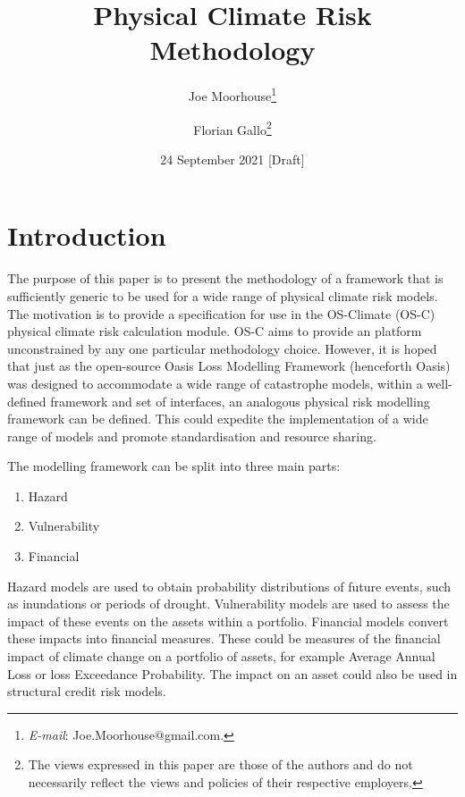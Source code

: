 \documentclass[a4paper,11pt]{extarticle} %
\title{Physical Climate Risk Methodology}
\author{Joe Moorhouse\thanks{\textit{E-mail}: Joe.Moorhouse@gmail.com.}
		\and
		Florian Gallo\thanks{
    	\smallskip	    
	    \newline%
	The views expressed in this paper are those of the authors and do not necessarily reflect the views and policies of their respective employers.}
	}
\date{24 September 2021 [Draft]}
\begin{document}

\maketitle{}



\clearpage
\setcounter{tocdepth}{4}
\renewcommand{\contentsname}{Contents}
\tableofcontents




\clearpage
\section{Introduction}
\label{Sec:Introduction}

The purpose of this paper is to present the methodology of a framework that is sufficiently generic to be used for a wide range of physical climate risk models. The motivation is to provide a specification for use in the OS-Climate (OS-C) \cite{OSC} physical climate risk calculation module. OS-C aims to provide an platform unconstrained by any one particular methodology choice. However, it is hoped that just as the open-source Oasis Loss Modelling Framework \cite{OasisLMF} (henceforth Oasis) was designed to accommodate a wide range of catastrophe models, within a well-defined framework and set of interfaces, an analogous physical risk modelling framework can be defined. This could expedite the implementation of a wide range of models and promote standardisation and resource sharing.

The modelling framework can be split into three main parts:

\begin{enumerate}
	\item Hazard 
	\item Vulnerability 
	\item Financial 
\end{enumerate}

Hazard models are used to obtain probability distributions of future events, such as inundations or periods of drought. Vulnerability models are used to assess the impact of these events on the assets within a portfolio. Financial models convert these impacts into financial measures. These could be measures of the financial impact of climate change on a portfolio of assets, for example Average Annual Loss or loss Exceedance Probability. The impact on an asset could also be used in structural credit risk models. 
\end{document}
